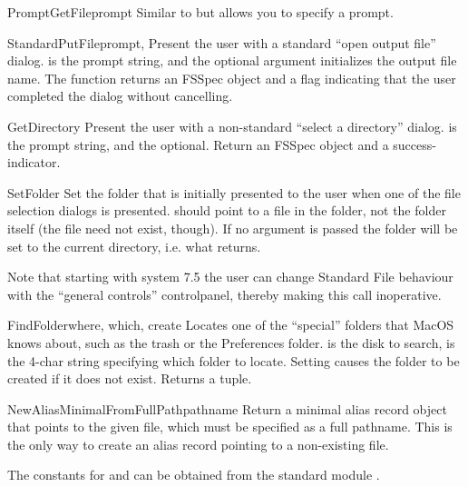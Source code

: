 \begin{funcdesc}{PromptGetFile}{prompt}
Similar to  but allows you to specify a prompt.
\end{funcdesc}

\begin{funcdesc}{StandardPutFile}{prompt, }
Present the user with a standard ``open output file''
dialog.  is the prompt string, and the optional
 argument initializes the output file name. The function
returns an FSSpec object and a flag indicating that the user completed
the dialog without cancelling.
\end{funcdesc}

\begin{funcdesc}{GetDirectory}{}
Present the user with a non-standard ``select a directory''
dialog.  is the prompt string, and the optional.
Return an FSSpec object and a success-indicator.
\end{funcdesc}

\begin{funcdesc}{SetFolder}{}
Set the folder that is initially presented to the user when one of
the file selection dialogs is presented.  should point to
a file in the folder, not the folder itself (the file need not exist,
though). If no argument is passed the folder will be set to the
current directory, i.e. what  returns.

Note that starting with system 7.5 the user can change Standard File
behaviour with the ``general controls'' controlpanel, thereby making
this call inoperative.
\end{funcdesc}

\begin{funcdesc}{FindFolder}{where, which, create}
Locates one of the ``special'' folders that MacOS knows about, such as
the trash or the Preferences folder.  is the disk to
search,  is the 4-char string specifying which folder to
locate. Setting  causes the folder to be created if it
does not exist. Returns a  tuple.
\end{funcdesc}

\begin{funcdesc}{NewAliasMinimalFromFullPath}{pathname}
Return a minimal alias record object that points to the given file, which
must be specified as a full pathname. This is the only way to create an
alias record pointing to a non-existing file.

The constants for  and  can be obtained from the
standard module .
\end{funcdesc}

